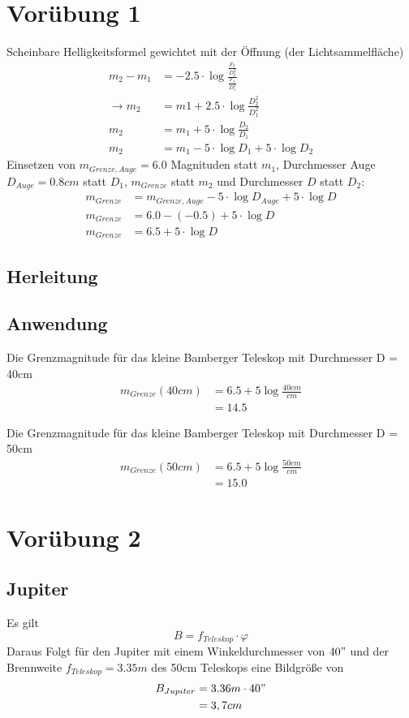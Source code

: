 \documentclass[titlepage]{scrartcl}
\begin{document}
\section{Vorübung 1}
Scheinbare Helligkeitsformel gewichtet mit der Öffnung (der Lichtsammelfläche)
\begin{align*}
m_2-m_1&=-2.5 \cdot\log \frac{\frac{F_2}{D_2^2}}{\frac{F_1}{D_1^2}}\\
\rightarrow m_2&=m1+2.5\cdot\log\frac{D_2^2}{D_1^2}\\
m_2&=m_1+5\cdot \log \frac{D_2}{D_1}\\
m_2&=m_1-5\cdot\log D_1 +5\cdot\log D_2
\end{align*}
Einsetzen von $m_{Grenze,Auge}=6.0$ Magnituden statt $m_1$, Durchmesser Auge $D_{Auge} = 0.8cm$ statt $D_1$, $m_{Grenze}$ statt $m_2$ und Durchmesser $D$ statt $D_2$:
\begin{align*}
m_{Grenze}&=m_{Grenze, Auge}-5\cdot\log D_{Auge} +5\cdot\log D\\
m_{Grenze}&=6.0-(-0.5) +5\cdot\log D\\
m_{Grenze}&=6.5 + 5\cdot \log D
\end{align*}
\subsection{Herleitung}
\subsection{Anwendung}
Die Grenzmagnitude für das kleine Bamberger Teleskop mit Durchmesser D = 40cm
\begin{align*}
m_{Grenze} (40cm)&= 6.5 + 5 \log \frac{40cm}{cm}\\
&= 14.5
\end{align*}

Die Grenzmagnitude für das kleine Bamberger Teleskop mit Durchmesser D = 50cm
\begin{align*}
m_{Grenze} (50cm)&= 6.5 + 5 \log \frac{50cm}{cm}\\
&= 15.0
\end{align*}
\section{Vorübung 2}
\subsection{Jupiter}
Es gilt
\begin{equation*}
B = f_{Teleskop}\cdot \varphi
\end{equation*}
Daraus Folgt für den Jupiter mit einem Winkeldurchmesser von $40"$ und der Brennweite $f_{Teleskop}=3.35m$ des 50cm Teleskops eine Bildgröße von
\begin{align*}
B_{Jupiter}&=3.36m \cdot 40"\\
&= 3,7 cm
\end{align*}
\end{document}
